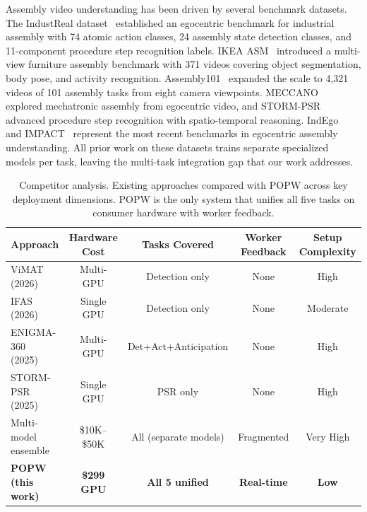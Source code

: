 \documentclass[10pt,twocolumn]{article}
\newcommand{\popw}{POPW}
\newcommand{\industreal}{IndustReal}
\begin{document}
Assembly video understanding has been driven by several benchmark datasets. The \industreal{} dataset~\cite{schoonbeek2024industreal} established an egocentric benchmark for industrial assembly with 74 atomic action classes, 24 assembly state detection classes, and 11-component procedure step recognition labels. IKEA ASM~\cite{benshabat2021ikea} introduced a multi-view furniture assembly benchmark with 371 videos covering object segmentation, body pose, and activity recognition. Assembly101~\cite{sener2022assembly101} expanded the scale to 4,321 videos of 101 assembly tasks from eight camera viewpoints. MECCANO~\cite{ragusa2023meccano} explored mechatronic assembly from egocentric video, and STORM-PSR~\cite{schoonbeek2025storm} advanced procedure step recognition with spatio-temporal reasoning. IndEgo~\cite{chavan2025indego} and IMPACT~\cite{impact2026} represent the most recent benchmarks in egocentric assembly understanding. All prior work on these datasets trains separate specialized models per task, leaving the multi-task integration gap that our work addresses.

\begin{table}[htbp]
\centering
\small
\caption{Competitor analysis. Existing approaches compared with \popw{} across key deployment dimensions. \popw{} is the only system that unifies all five tasks on consumer hardware with worker feedback.}
\label{tab:competitors}
\begin{tabular}{l c c c c}
\toprule
\textbf{Approach} & \textbf{Hardware Cost} & \textbf{Tasks Covered} & \textbf{Worker Feedback} & \textbf{Setup Complexity} \\
\midrule
ViMAT (2026)~\cite{vimat2026} & Multi-GPU & Detection only & None & High \\
IFAS (2026)~\cite{ifas2026} & Single GPU & Detection only & None & Moderate \\
ENIGMA-360 (2025)~\cite{enigma2025} & Multi-GPU & Det+Act+Anticipation & None & High \\
STORM-PSR (2025)~\cite{schoonbeek2025storm} & Single GPU & PSR only & None & High \\
Multi-model ensemble & \$10K--\$50K & All (separate models) & Fragmented & Very High \\
\textbf{\popw{} (this work)} & \textbf{\$299 GPU} & \textbf{All 5 unified} & \textbf{Real-time} & \textbf{Low} \\
\bottomrule
\end{tabular}
\end{table}
\end{document}
